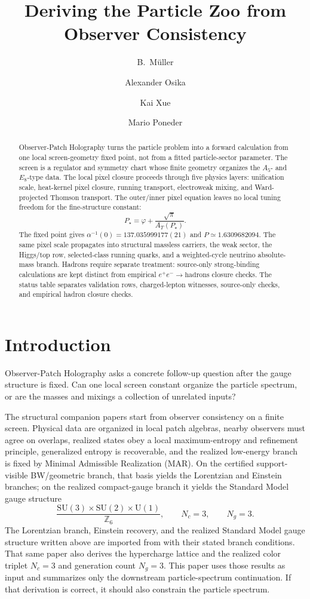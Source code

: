 \documentclass[11pt]{article}
\title{Deriving the Particle Zoo from\\
Observer Consistency}
\author{B.\ M\"uller \and Alexander Osika \and Kai Xue \and Mario Poneder}
\date{\OPHPaperReleaseDate}
\newcommand{\SU}{\mathrm{SU}}
\newcommand{\U}{\mathrm{U}}
\begin{document}
\maketitle
\OPHPaperReleaseBanner

\begin{abstract}
Observer-Patch Holography turns the particle problem into a forward calculation from one local screen-geometry fixed point, not from a fitted particle-sector parameter. The screen is a regulator and symmetry chart whose finite geometry organizes the \(A_5\)- and \(E_8\)-type data. The local pixel closure proceeds through five physics layers: unification scale, heat-kernel pixel closure, running transport, electroweak mixing, and Ward-projected Thomson transport. The outer/inner pixel equation leaves no local tuning freedom for the fine-structure constant:
\[
P_\star=\varphi+\frac{\sqrt{\pi}}{A_T(P_\star)}.
\]
The fixed point gives \(\alpha^{-1}(0)=137.035999177(21)\) and \(P\simeq1.6309682094\). The same pixel scale propagates into structural massless carriers, the weak sector, the Higgs/top row, selected-class running quarks, and a weighted-cycle neutrino absolute-mass branch. Hadrons require separate treatment: source-only strong-binding calculations are kept distinct from empirical \(e^+e^-\to\mathrm{hadrons}\) closure checks. The status table separates validation rows, charged-lepton witnesses, source-only checks, and empirical hadron closure checks.
\end{abstract}

\section{Introduction}

Observer-Patch Holography asks a concrete follow-up question after the gauge structure is fixed.
Can one local screen constant organize the particle spectrum, or are the masses and mixings a
collection of unrelated inputs?

The structural companion papers start from observer consistency on a finite screen. Physical data are organized in local patch algebras, nearby observers must agree on overlaps, realized states obey a local maximum-entropy and refinement principle, generalized entropy is recoverable, and the realized low-energy branch is fixed by Minimal Admissible Realization (MAR). On the certified support-visible BW/geometric branch, that basis yields the Lorentzian and Einstein branches; on the realized compact-gauge branch it yields the Standard Model gauge structure
\[
\frac{\SU(3)\times\SU(2)\times\U(1)}{\mathbb Z_6},
\qquad
N_c=3,
\qquad
N_g=3.
\]
The Lorentzian branch, Einstein recovery, and the realized Standard Model gauge structure written
above are imported from \cite{ophcompact} with their stated branch conditions. That same paper also derives the hypercharge lattice and
the realized color triplet \(N_c=3\) and generation count \(N_g=3\). This paper uses those results as input and summarizes only the
downstream particle-spectrum continuation. If that derivation is correct, it should also constrain the particle spectrum.
\end{document}
